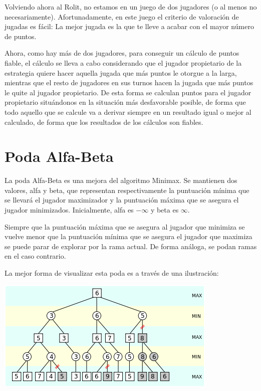 \documentclass[../DocumentoOficial.tex]{subfiles}
\begin{document}
Volviendo ahora al Rolit, no estamos en un juego de dos jugadores (o al menos no necesariamente). Afortunadamente, en este juego el criterio de valoración de jugadas es fácil: La mejor jugada es la que te lleve a acabar con el mayor número de puntos.

Ahora, como hay más de dos jugadores, para conseguir un cálculo de puntos fiable, el cálculo se lleva a cabo considerando que el jugador propietario de la estrategia quiere hacer aquella jugada que más puntos le otorgue a la larga, mientras que el resto de jugadores en sus turnos hacen la jugada que más puntos le quite al jugador propietario. De esta forma se calculan puntos para el jugador propietario situándonos en la situación más desfavorable posible, de forma que todo aquello que se calcule va a derivar siempre en un resultado igual o mejor al calculado, de forma que los resultados de los cálculos son fiables.

\chapter{Poda Alfa-Beta}
\label{ch:AnexoIV}
La poda Alfa-Beta es una mejora del algoritmo Minimax. Se mantienen dos valores, alfa y beta, que representan respectivamente la puntuación mínima que se llevará el jugador maximizador y la puntuación máxima que se asegura el jugador minimizados. Inicialmente, alfa es $-\infty$ y beta es $\infty$. 

Siempre que la puntuación máxima que se asegura al jugador que minimiza se vuelve menor que la puntuación mínima que se asegura el jugador que maximiza se puede parar de explorar por la rama actual. De forma análoga, se podan ramas en el caso contrario.

La mejor forma de visualizar esta poda es a través de una ilustración:

\begin{center}
\includegraphics[scale=0.5]{poda alfa-beta.png}
\end{center}
\end{document}
